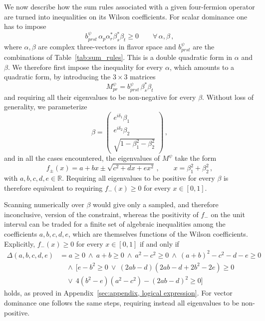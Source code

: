 We now describe how the sum rules associated with a given four-fermion operator are turned into
inequalities on its Wilson coefficients. For scalar dominance one has to impose
\begin{equation}
    b^\psi_{prst}\,\alpha_p \alpha_r^* \beta^*_s \beta_t\geq0\qquad \forall\,\alpha,\beta\,,
\end{equation}
where $\alpha,\beta$ are complex three-vectors in flavor space and $b_{prst}^\psi$ are the
combinations of Table~\ref{tab:sum_rules}. This is a double quadratic form in $\alpha$ and $\beta$.
We therefore first impose the inequality for every $\alpha$, which amounts to a quadratic form, by
introducing the $3\times 3$ matrices
\begin{equation}
    M^\psi_{pr}= b^\psi_{prst}\,\beta^*_s \beta_t
\end{equation}
and requiring all their eigenvalues to be non-negative for every $\beta$. Without loss of generality, we
parameterize
\begin{equation}
    \beta=
    \begin{pmatrix}
        e^{i\delta_1}\beta_1 \\ e^{i\delta_2}\beta_2 \\ \sqrt{1-\beta_1^2-\beta_2^2}
    \end{pmatrix}\,,
\end{equation}
and in all the cases encountered, the eigenvalues of $M^\psi$ take the form
\begin{equation}\label{eq:eigenvalue form}
    f_\pm(x)=a + bx \pm \sqrt{c^2 + dx + ex^2}\,,\qquad x=\beta_1^2+\beta^2_2\,,
\end{equation}
with $a,b,c,d,e\in\mathbb{R}$.
Requiring all eigenvalues to be positive for
every $\beta$ is therefore equivalent to requiring $f_-(x)\geq0$ for every $x\in[0,1]$.

Scanning numerically over $\beta$ would give
only a sampled, and therefore inconclusive, version of the constraint, whereas the positivity of $f_-$
on the unit interval can be traded for a finite set of algebraic inequalities among the coefficients
$a,b,c,d,e$, which are themselves functions of the Wilson coefficients. Explicitly, $f_-(x)\geq0$ for
every $x\in[0,1]$ if and only if
\begin{align}\label{eq:Delta}
    \Delta(a,b,c,d,e) &= 
    a \ge 0 
    \ \land \
    a+b \ge 0
    \ \land \ 
    a^2 - c^2 \ge 0
    \ \land \ 
    (a+b)^2 - c^2 -d-e \ge 0 \nonumber
    \\& \quad
    \land \
    [e - b^2 \ge 0 \ \lor\  (2ab-d)(2ab-d+2b^2-2e) \ge 0 \nonumber 
    \\& \quad
    \lor \ 4(b^2-e)(a^2-c^2)-(2ab-d)^2 \ge 0]
\end{align}
holds, as proved in Appendix~\ref{sec:appendix, logical expression}.
For vector dominance one follows the same steps, requiring instead all eigenvalues to be non-positive.

